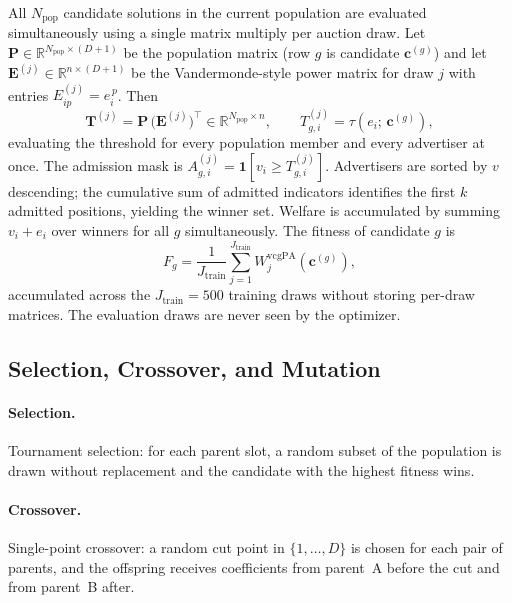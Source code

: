 \documentclass[11pt]{article}
\newcommand{\bsc}{\mathbf{c}}
\begin{document}
All $N_{\text{pop}}$ candidate solutions in the current population are evaluated
simultaneously using a single matrix multiply per auction draw.  Let
$\mathbf{P} \in \mathbb{R}^{N_{\text{pop}} \times (D+1)}$ be the population matrix
(row $g$ is candidate $\bsc^{(g)}$) and let
$\mathbf{E}^{(j)} \in \mathbb{R}^{n \times (D+1)}$ be the Vandermonde-style
power matrix for draw $j$ with entries $E^{(j)}_{ip} = e_i^{\,p}$.
Then
\begin{equation}
    \mathbf{T}^{(j)} = \mathbf{P}\,\bigl(\mathbf{E}^{(j)}\bigr)^{\!\top}
    \in \mathbb{R}^{N_{\text{pop}} \times n},
    \qquad T^{(j)}_{g,i} = \tau(e_i;\,\bsc^{(g)}),
    \label{eq:tau_mat}
\end{equation}
evaluating the threshold for every population member and every advertiser at once.
The admission mask is $A^{(j)}_{g,i} = \mathbf{1}[v_i \geq T^{(j)}_{g,i}]$.
Advertisers are sorted by $v$ descending; the cumulative sum of admitted indicators
identifies the first $k$ admitted positions, yielding the winner set.
Welfare is accumulated by summing $v_i + e_i$ over winners for all $g$ simultaneously.
The fitness of candidate $g$ is
\begin{equation}
    F_g = \frac{1}{J_{\text{train}}}\sum_{j=1}^{J_{\text{train}}} W^{\text{vcgPA}}_j(\bsc^{(g)}),
\end{equation}
accumulated across the $J_{\text{train}} = 500$ training draws without storing
per-draw matrices.  The evaluation draws are never seen by the optimizer.

\subsection{Selection, Crossover, and Mutation}

\paragraph{Selection.}
Tournament selection: for each parent slot, a random subset of the population is
drawn without replacement and the candidate with the highest fitness wins.

\paragraph{Crossover.}
Single-point crossover: a random cut point in $\{1,\ldots,D\}$ is chosen for each
pair of parents, and the offspring receives coefficients from parent~A before the
cut and from parent~B after.
\end{document}
